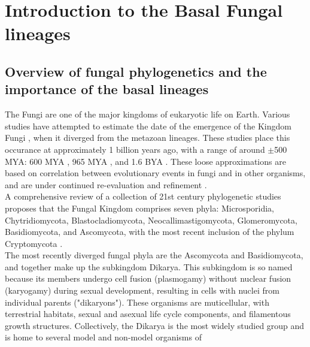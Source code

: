 \chapter{Introduction to the Basal Fungal lineages}
\section{Overview of fungal phylogenetics and the importance of the basal lineages}
The Fungi are one of the major kingdoms of eukaryotic life on
Earth. Various studies have attempted to estimate the date of the
emergence of the Kingdom Fungi \cite{Taylor2006}, when it diverged
from the metazoan lineages. These studies place this occurance at
approximately 1 billion years ago, with a range of around $\pm$500
MYA: 600 MYA \cite{Berbee1993}, 965 MYA \cite{Doolittle1996}, and 1.6
BYA \cite{Wang1999}. These loose approximations are based on
correlation between evolutionary events in fungi and in other
organisms, and are under continued re-evaluation and refinement
\cite{Berbee2010}.\\
\indent A comprehensive review of a collection of 21st century
phylogenetic studies \cite{Hibbett2007} proposes that the Fungal
Kingdom comprises seven phyla: Microsporidia, Chytridiomycota,
Blastocladiomycota, Neocallimastigomycota, Glomeromycota,
Basidiomycota, and Ascomycota, with the most recent inclusion of the
phylum Cryptomycota \cite{Jones2011}.\\
\indent The most recently diverged fungal phyla are the Ascomycota and
Basidiomycota, and together make up the subkingdom Dikarya. This
subkingdom is so named because its members undergo cell fusion
(plasmogamy) without nuclear fusion (karyogamy) during sexual
development, resulting in cells with nuclei from individual parents
("dikaryons"). These organisms are muticellular, with terrestrial
habitats, sexual and asexual life cycle components, and filamentous
growth structures. Collectively, the Dikarya is the most widely
studied group and is home to several model and non-model organisms of

